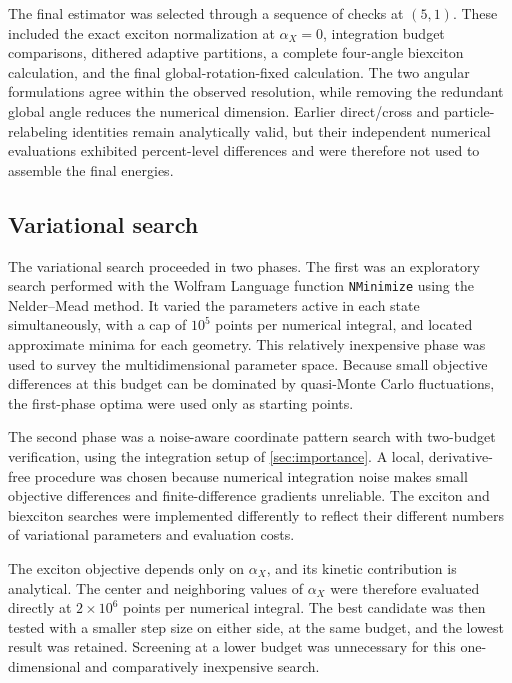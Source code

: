 The final estimator was selected through a sequence of checks at $(5,1)$.
These included the exact exciton normalization at $\alpha_X=0$, integration
budget comparisons, dithered adaptive partitions, a complete four-angle
biexciton calculation, and the final global-rotation-fixed calculation. The
two angular formulations agree within the observed resolution, while removing
the redundant global angle reduces the numerical dimension. Earlier
direct/cross and particle-relabeling identities remain analytically valid,
but their independent numerical evaluations exhibited percent-level
differences and were therefore not used to assemble the final energies.

\subsection{Variational search}
\label{sec:optimization}

The variational search proceeded in two phases. The first was an exploratory
search performed with the Wolfram Language function
\texttt{NMinimize} using the Nelder--Mead method. It varied the parameters
active in each state simultaneously, with a cap of $10^5$ points per numerical
integral, and located
approximate minima for each geometry. This relatively inexpensive phase was
used to survey the multidimensional parameter space. Because small objective
differences at this budget can be dominated by quasi-Monte Carlo fluctuations,
the first-phase optima were used only as starting points.

The second phase was a noise-aware coordinate pattern search with two-budget
verification, using the integration setup of \cref{sec:importance}. A local,
derivative-free procedure was chosen because numerical integration noise makes
small objective differences and finite-difference gradients unreliable. The
exciton and biexciton searches were implemented differently to reflect their
different numbers of variational parameters and evaluation costs.

The exciton objective depends only on $\alpha_X$, and its kinetic contribution
is analytical. The center and neighboring values of $\alpha_X$ were therefore
evaluated directly at $2\times10^6$ points per numerical integral. The best
candidate was then tested with a smaller step size on either side, at the same
budget, and the lowest result was retained. Screening at a lower budget was
unnecessary for this one-dimensional and comparatively inexpensive search.

